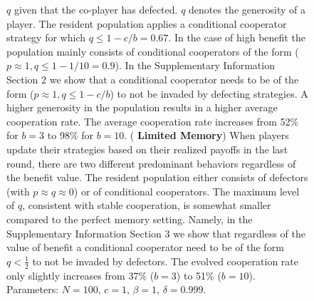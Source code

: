 \documentclass[11pt]{article}
\theoremstyle{plainCl1}
\theoremstyle{plainCl2}
\begin{document}
{\begin{figure}[!htbp]
{    $q$ given that the co-player has defected. $q$ denotes the generosity of a
    player. The resident population applies a conditional cooperator strategy
    for which $q\!\le\!1\!-\!c/b\!=\!0.67$. 
    In the case of high benefit the population mainly consists of conditional
    cooperators of the form ($p\!\approx\!1\!, q\!\le\!1\!-\!1/10\!=\!0.9$). In
    the Supplementary Information Section 2 we show that a conditional
    cooperator needs to be of the form ($p\!\approx\!1\!, q\!\le\!1\!-\!c/b$) to
    not be invaded by defecting strategies. A higher generosity in the
    population results in a higher average cooperation rate. The average
    cooperation rate increases from 52\% for \(b=3\) to 98\% for \(b=10\). ({\bf
    Limited Memory}) When players update their strategies based on their
    realized payoffs in the last round, there are two different predominant
    behaviors regardless of the benefit value. The resident population either
    consists of defectors (with $p\!\approx\!q\!\approx\!0$) or of conditional
    cooperators. The maximum level of $q$, consistent with stable cooperation, is
    somewhat smaller compared to the perfect memory setting.
    Namely, in the Supplementary Information Section 3 we show that
    regardless of the value of benefit a conditional cooperator need to be of
    the form $q\!<\!\frac{1}{2}$ to not be invaded by defectors.
    The evolved cooperation
    rate only slightly increases from 37\% ($b=3$) to 51\% ($b=10$). Parameters: $N\!=\!100$,
    $c\!=\!1$, $\beta\!=\!1$, $\delta\!=\!0.999$.}
    \label{fig:expected_and_stochastic_for_donation}
\end{figure}

}
\end{document}
